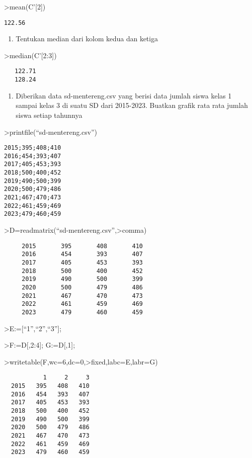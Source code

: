 \documentclass[
]{book}
\providecommand{\tightlist}{%
  \setlength{\itemsep}{0pt}\setlength{\parskip}{0pt}}
\begin{document}
\textgreater mean(C'{[}2{]})

\begin{verbatim}
122.56
\end{verbatim}

\begin{enumerate}
\def\labelenumi{\alph{enumi}.}
\setcounter{enumi}{2}
\tightlist
\item
  Tentukan median dari kolom kedua dan ketiga
\end{enumerate}

\textgreater median(C'{[}2:3{]})

\begin{verbatim}
   122.71 
   128.24 
\end{verbatim}

\begin{enumerate}
\def\labelenumi{\arabic{enumi}.}
\setcounter{enumi}{2}
\tightlist
\item
  Diberikan data sd-mentereng.csv yang berisi data jumlah siswa kelas 1 sampai kelas 3 di suatu SD dari 2015-2023. Buatkan grafik rata rata jumlah siswa setiap tahunnya
\end{enumerate}

\textgreater printfile(``sd-mentereng.csv'')

\begin{verbatim}
2015;395;408;410
2016;454;393;407
2017;405;453;393
2018;500;400;452
2019;490;500;399
2020;500;479;486
2021;467;470;473
2022;461;459;469
2023;479;460;459
\end{verbatim}

\textgreater D=readmatrix(``sd-mentereng.csv'',\textgreater comma)

\begin{verbatim}
     2015       395       408       410 
     2016       454       393       407 
     2017       405       453       393 
     2018       500       400       452 
     2019       490       500       399 
     2020       500       479       486 
     2021       467       470       473 
     2022       461       459       469 
     2023       479       460       459 
\end{verbatim}

\textgreater E:={[}``1'',``2'',``3''{]};

\textgreater F:=D{[},2:4{]}; G:=D{[},1{]};

\textgreater writetable(F,wc=6,dc=0,\textgreater fixed,labc=E,labr=G)

\begin{verbatim}
           1     2     3
  2015   395   408   410
  2016   454   393   407
  2017   405   453   393
  2018   500   400   452
  2019   490   500   399
  2020   500   479   486
  2021   467   470   473
  2022   461   459   469
  2023   479   460   459
\end{verbatim}
\end{document}
